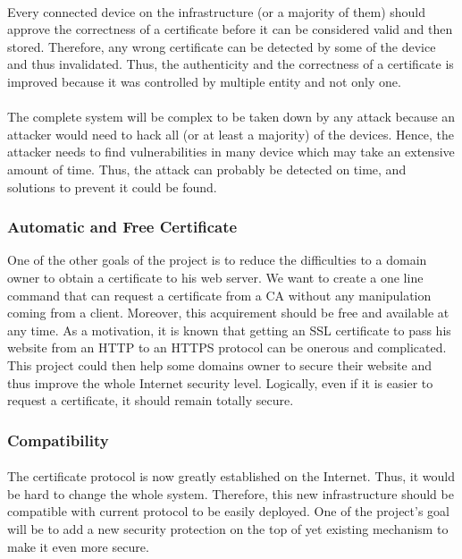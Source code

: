 \documentclass[11pt, a4paper, twoside, openright]{article}
\begin{document}
\paragraph{}
Every connected device on the infrastructure (or a majority of them) should approve the correctness of a certificate before it can be considered valid and then stored. Therefore, any wrong certificate can be detected by some of the device and thus invalidated. Thus, the authenticity and the correctness of a certificate is improved because it was controlled by multiple entity and not only one.
\paragraph{}
The complete system will be complex to be taken down by any attack because an attacker would need to hack all (or at least a majority) of the devices. Hence, the attacker needs to find vulnerabilities in many device which may take an extensive amount of time. Thus, the attack can probably be detected on time, and solutions to prevent it could be found.
\subsubsection{Automatic and Free Certificate}
One of the other goals of the project is to reduce the difficulties to a domain owner to obtain a certificate to his web server. We want to create a one line command that can request a certificate from a CA without any manipulation coming from a client. Moreover, this acquirement should be free and available at any time. As a motivation, it is known that getting an SSL certificate to pass his website from an HTTP to an HTTPS protocol can be onerous and complicated. This project could then help some domains owner to secure their website and thus improve the whole Internet security level. Logically, even if it is easier to request a certificate, it should remain totally secure.
\subsubsection{Compatibility}
\paragraph{}The certificate protocol is now greatly established on the Internet. Thus, it would be hard to change the whole system. Therefore, this new infrastructure should be compatible with current protocol to be easily deployed. One of the project's goal will be to add a new security protection on the top of yet existing mechanism to make it even more secure.     
\end{document}
